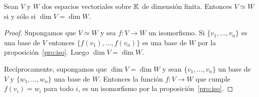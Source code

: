 \begin{thm}
	Sean $V$ y $W$ dos espacios vectoriales sobre $\mathbb{K}$ de dimensión finita.
	Entonces $V\simeq W$ si y sólo si $\dim V=\dim W$. 

	\begin{proof}
		Supongamos que $V\simeq W$ y sea $f\colon V\to W$ un isomorfismo. Si
		$\{v_1,\dots,v_n\}$ es una base de $V$ entonces
		$\{f(v_1),\dots,f(v_n)\}$ es una base de $W$ por la
		proposición~\ref{pro:iso}. Luego $\dim V=\dim W$.

		Recíprocamente, supongamos que $\dim V=\dim W$ y sean
		$\{v_1,\dots,v_n\}$ un base de $V$ y $\{w_1,\dots,w_n\}$ una base de
		$W$. Entonces la función $f\colon V\to W$ que cumple $f(v_i)=w_i$ para
		todo $i$, es un isomorfismo por la 
		proposición~\ref{pro:iso}.
	\end{proof}
\end{thm}


